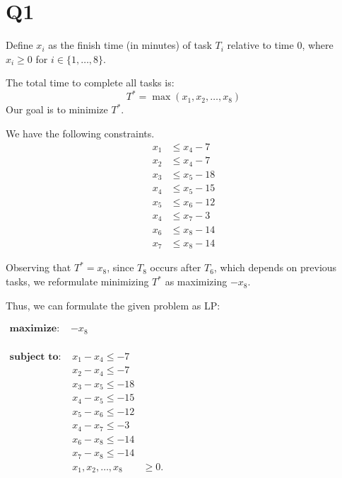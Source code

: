 \section*{Q1}

Define \( x_i \) as the finish time (in minutes) of task \( T_i \) relative to time 0, where \( x_i \geq 0 \) for \( i \in \{1, \dots, 8\} \).  

The total time to complete all tasks is:
\[
T^* = \max(x_1, x_2, \dots, x_8)
\]
Our goal is to minimize \( T^* \).  

We have the following constraints.
\begin{align*}
x_1 &\leq x_4 - 7 \\
x_2 &\leq x_4 - 7 \\
x_3 &\leq x_5 - 18 \\
x_4 &\leq x_5 - 15 \\
x_5 &\leq x_6 - 12 \\
x_4 &\leq x_7 - 3 \\
x_6 &\leq x_8 - 14 \\
x_7 &\leq x_8 - 14
\end{align*}

Observing that \( T^* = x_8 \), since \( T_8 \) occurs after \( T_6 \), which depends on previous tasks, we reformulate minimizing \( T^* \) as maximizing \( -x_8 \).

Thus, we can formulate the given problem as LP:

$
\begin{aligned}
    \textbf{maximize: } & -x_8 \\
\end{aligned}
$

$
\begin{aligned}
    \textbf{subject to: }
    & x_1 - x_4 \leq -7 \\
    & x_2 - x_4 \leq -7 \\
    & x_3 - x_5 \leq -18 \\
    & x_4 - x_5 \leq -15 \\
    & x_5 - x_6 \leq -12 \\
    & x_4 - x_7 \leq -3 \\
    & x_6 - x_8 \leq -14 \\
    & x_7 - x_8 \leq -14 \\
    & x_1, x_2, \dots, x_8 &\geq 0.
\end{aligned}
$